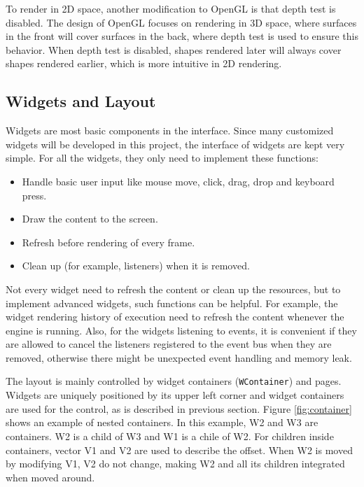 \documentclass[msc,deptreport, cs]{infthesis}
\begin{document}
To render in 2D space, another modification to OpenGL is that depth test is disabled. The design of OpenGL focuses on rendering in 3D space, where surfaces in the front will cover surfaces in the back, where depth test is used to ensure this behavior. When depth test is disabled, shapes rendered later will always cover shapes rendered earlier, which is more intuitive in 2D rendering.

\subsection{Widgets and Layout}

Widgets are most basic components in the interface. Since many customized widgets will be developed in this project, the interface of widgets are kept very simple. For all the widgets, they only need to implement these functions: 
\begin{itemize}
  \item Handle basic user input like mouse move, click, drag, drop and keyboard press.
  \vspace{-1em}\item Draw the content to the screen.
  \vspace{-1em}\item Refresh before rendering of every frame.
  \vspace{-1em}\item Clean up (for example, listeners) when it is removed.
\end{itemize}

Not every widget need to refresh the content or clean up the resources, but to implement advanced widgets, such functions can be helpful. For example, the widget rendering history of execution need to refresh the content whenever the engine is running. Also, for the widgets listening to events, it is convenient if they are allowed to cancel the listeners registered to the event bus when they are removed, otherwise there might be unexpected event handling and memory leak.

The layout is mainly controlled by widget containers (\verb+WContainer+) and pages. Widgets are uniquely positioned by its upper left corner and widget containers are used for the control, as is described in previous section. Figure \ref{fig:container} shows an example of nested containers. In this example, W2 and W3 are containers. W2 is a child of W3 and W1 is a chile of W2.
For children inside containers, vector V1 and V2 are used to describe the offset. When W2 is moved by modifying V1, V2 do not change, making W2 and all its children integrated when moved around.
\end{document}
